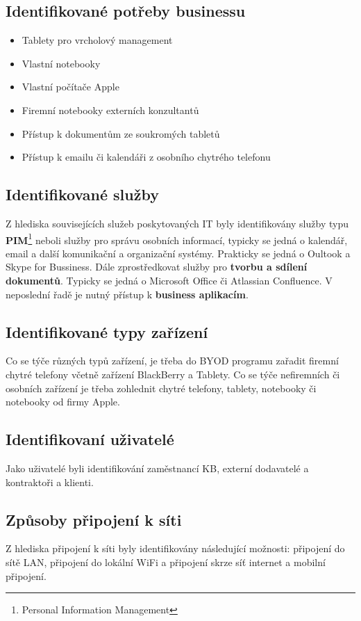 \subsection{Identifikované potřeby businessu}
\begin{itemize}
    \item Tablety pro vrcholový management
    \item Vlastní notebooky
    \item Vlastní počítače Apple
    \item Firemní notebooky externích konzultantů
    \item Přístup k dokumentům ze soukromých tabletů
    \item Přístup k emailu či kalendáři z osobního chytrého telefonu
\end{itemize}

\subsection{Identifikované služby}
Z hlediska souvisejících služeb poskytovaných IT byly identifikovány služby typu \textbf{PIM}\footnote{Personal Information Management} neboli služby pro správu osobních informací, typicky se jedná o kalendář, email a další komunikační a organizační systémy. Prakticky se jedná o Oultook a Skype for Bussiness. Dále zprostředkovat služby pro \textbf{tvorbu a sdílení dokumentů}. Typicky se jedná o Microsoft Office či Atlassian Confluence. V neposlední řadě je nutný přístup k \textbf{business aplikacím}.

\subsection{Identifikované typy zařízení}
Co se týče různých typů zařízení, je třeba do BYOD programu zařadit firemní chytré telefony včetně zařízení BlackBerry a Tablety. Co se týče nefiremních či osobních zařízení je třeba zohlednit chytré telefony, tablety, notebooky či notebooky od firmy Apple.

\subsection{Identifikovaní uživatelé}
Jako uživatelé byli identifikování zaměstnancí KB, externí dodavatelé a kontraktoři a klienti.

\subsection{Způsoby připojení k síti}
Z hlediska připojení k síti byly identifikovány následující možnosti: připojení do sítě LAN, připojení do lokální WiFi a připojení skrze síť internet a mobilní připojení.

